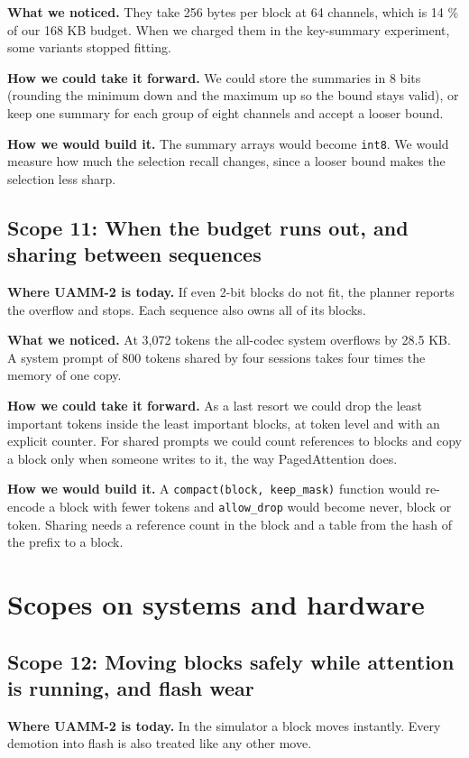 \documentclass[12pt,a4paper]{report}
\begin{document}
\textbf{What we noticed.} They take 256 bytes per block at 64 channels, which is 14 \% of our 168 KB budget. When we charged them in the key-summary experiment, some variants stopped fitting.

\textbf{How we could take it forward.} We could store the summaries in 8 bits (rounding the minimum down and the maximum up so the bound stays valid), or keep one summary for each group of eight channels and accept a looser bound.

\textbf{How we would build it.} The summary arrays would become \texttt{int8}. We would measure how much the selection recall changes, since a looser bound makes the selection less sharp.

\subsection{Scope 11: When the budget runs out, and sharing between sequences}
\textbf{Where UAMM-2 is today.} If even 2-bit blocks do not fit, the planner reports the overflow and stops. Each sequence also owns all of its blocks.

\textbf{What we noticed.} At 3,072 tokens the all-codec system overflows by 28.5 KB. A system prompt of 800 tokens shared by four sessions takes four times the memory of one copy.

\textbf{How we could take it forward.} As a last resort we could drop the least important tokens inside the least important blocks, at token level and with an explicit counter. For shared prompts we could count references to blocks and copy a block only when someone writes to it, the way PagedAttention does.

\textbf{How we would build it.} A \texttt{compact(block, keep\_\allowbreak{}\allowbreak{}mask)} function would re-encode a block with fewer tokens and \texttt{allow\_\allowbreak{}\allowbreak{}drop} would become never, block or token. Sharing needs a reference count in the block and a table from the hash of the prefix to a block.

\section{Scopes on systems and hardware}
\subsection{Scope 12: Moving blocks safely while attention is running, and flash wear}
\textbf{Where UAMM-2 is today.} In the simulator a block moves instantly. Every demotion into flash is also treated like any other move.
\end{document}
